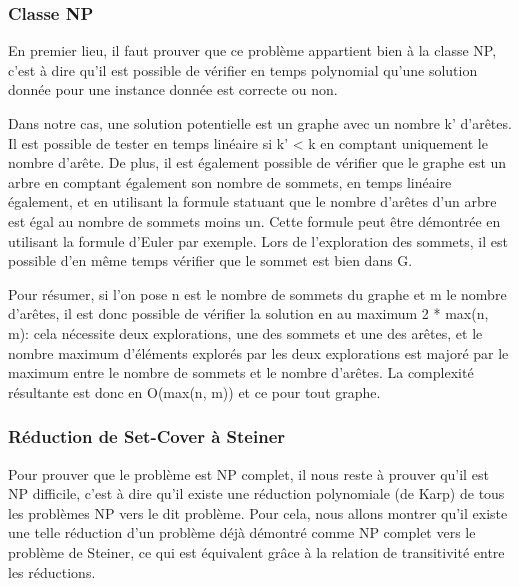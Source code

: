 \documentclass{article}
\begin{document}
\subsubsection{Classe NP}
En premier lieu, il faut prouver que ce problème appartient bien à la classe NP, c'est à dire qu'il est possible de vérifier en temps polynomial qu'une solution donnée pour une instance donnée est correcte ou non. \\ \par

Dans notre cas, une solution potentielle est un graphe avec un nombre k' d'arêtes. Il est possible de tester en temps linéaire si k' < k en comptant uniquement le nombre d'arête. De plus, il est également possible de vérifier que le graphe est un arbre en comptant également son nombre de sommets, en temps linéaire également, et en utilisant la formule statuant que le nombre d'arêtes d'un arbre est égal au nombre de sommets moins un. Cette formule peut être démontrée en utilisant la formule d'Euler par exemple. Lors de l'exploration des sommets, il est possible d'en même temps vérifier que le sommet est bien dans G.\\ \par
Pour résumer, si l'on pose n est le nombre de sommets du graphe et m le nombre d'arêtes, il est donc possible de vérifier la solution en au maximum 2 * max(n, m): cela nécessite deux explorations, une des sommets et une des arêtes, et le nombre maximum d'éléments explorés par les deux explorations est majoré par le maximum entre le nombre de sommets et le nombre d'arêtes. La complexité résultante est donc en O(max(n, m)) et ce pour tout graphe.

\subsubsection{Réduction de Set-Cover à Steiner}
Pour prouver que le problème est NP complet, il nous reste à prouver qu'il est NP difficile, c'est à dire qu'il existe une réduction polynomiale (de Karp) de tous les problèmes NP vers le dit problème. Pour cela, nous allons montrer qu'il existe une telle réduction d'un problème déjà démontré comme NP complet vers le problème de Steiner, ce qui est équivalent grâce à la relation de transitivité entre les réductions. \\ \par
\end{document}
